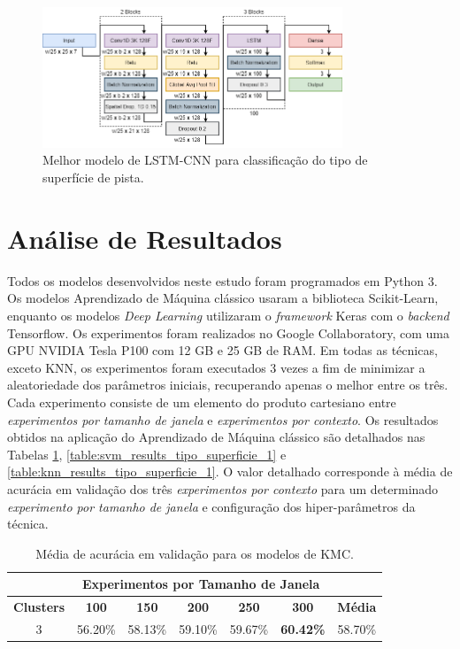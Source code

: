 \begin{figure}[h]
  \centering
  \caption{Melhor modelo de LSTM-CNN para classificação do tipo de superfície de pista.}
  \label{fig:best_cnn_lstm_tipo_superficie_1}
  \includegraphics[width=0.8\textwidth]{figuras/fig_33.png}
\end{figure}

\section{Análise de Resultados}

Todos os modelos desenvolvidos neste estudo foram programados em Python 3. Os modelos Aprendizado de Máquina clássico usaram a biblioteca Scikit-Learn, enquanto os modelos \textit{Deep Learning} utilizaram o \textit{framework} Keras com o \textit{backend} Tensorflow. Os experimentos foram realizados no Google Collaboratory, com uma GPU NVIDIA Tesla P100 com 12 GB e 25 GB de RAM. Em todas as técnicas, exceto KNN, os experimentos foram executados 3 vezes a fim de minimizar a aleatoriedade dos parâmetros iniciais, recuperando apenas o melhor entre os três. Cada experimento consiste de um elemento do produto cartesiano entre \emph{experimentos por tamanho de janela} e \emph{experimentos por contexto}. Os resultados obtidos na aplicação do Aprendizado de Máquina clássico são detalhados nas Tabelas \ref{table:kmc_results_tipo_superficie_1}, \ref{table:svm_results_tipo_superficie_1} e \ref{table:knn_results_tipo_superficie_1}. O valor detalhado corresponde à média de acurácia em  validação dos três \textit{experimentos por contexto} para um determinado \emph{experimento por tamanho de janela} e configuração dos hiper-parâmetros da técnica.

\begin{table}[H]
\scriptsize
\centering
\caption{Média de acurácia em validação para os modelos de KMC.} 
\label{table:kmc_results_tipo_superficie_1}
\begin{tabular}{ccccccc}
\cmidrule(lr){2-6}
& \multicolumn{5}{c}{\textbf{Experimentos por Tamanho de Janela}} & \multicolumn{1}{c}{} \\ \midrule
\textbf{Clusters} & \textbf{100} & \textbf{150} & \textbf{200} & \textbf{250} & \textbf{300} & \textbf{Média} \\ \midrule
3 & 56.20\% & 58.13\% &  59.10\% & 59.67\% & \cellcolor[HTML]{34FF34}\textbf{60.42\%} & 58.70\% \\ \bottomrule
\end{tabular}
\end{table}

